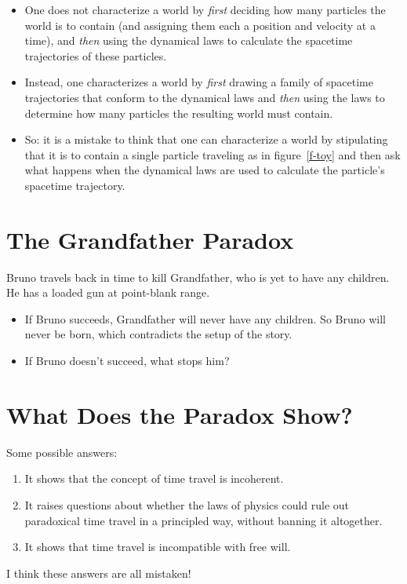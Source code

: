 \documentclass[12pt]{extarticle}
\begin{document}
\begin{itemize}

\item One does not characterize a world by \emph{first} deciding how many particles the world is to contain (and assigning them each a position and velocity at a time), and \emph{then} using the dynamical laws to calculate the spacetime trajectories of these particles. 

\item Instead, one characterizes a world by \emph{first} drawing a family of spacetime trajectories that conform to the dynamical laws and \emph{then} using the laws to determine how many particles the resulting world must contain. 

\item So: it is a mistake to think that one can characterize a world by stipulating that it is to contain a single particle traveling as in figure~\ref{f-toy} and then ask what happens when the dynamical laws are used to calculate the particle's spacetime trajectory.


\end{itemize}


\section{The Grandfather Paradox}


Bruno travels back in time to kill Grandfather, who is yet to have any children. He has a loaded gun at point-blank range. 

\begin{itemize}

\item If Bruno succeeds, Grandfather will never have any children. So Bruno will never be born, which contradicts the setup of the story.

\item If Bruno doesn't succeed, what stops him?


\end{itemize}

\iffalse %

\section{What Does the Paradox Show?}

Some possible answers:
\begin{enumerate}

\item It shows that the concept of time travel is incoherent.

\item It raises questions about whether the laws of physics could rule out paradoxical time travel in a principled way, without banning it altogether.


\item It shows that time travel is incompatible with free will.


\end{enumerate}
I think these answers are all mistaken!
\end{document}
